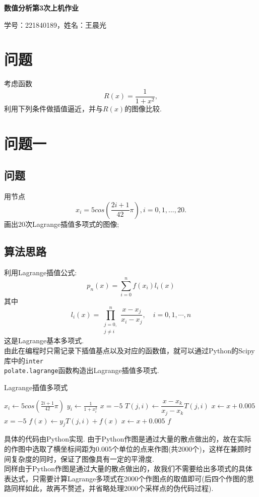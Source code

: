 \documentclass[UTF8,ctexart,a4paper,11pt,openany]{article}
\theoremstyle{definition}
\newcommand\e{\leftarrow}
\begin{document}
\begin{center}
{\huge \textbf{数值分析第3次上机作业}}

{\large 学号：221840189，姓名：王晨光}
\end{center}
\section{问题}
    考虑函数$$R(x)=\frac{1}{1+x^2},$$利用下列条件做插值逼近，并与$R(x)$的图像比较.
\section{问题一}
    \subsection{问题}
    用节点$$x_i=5cos(\frac{2i+1}{42}\pi),i=0,1,...,20.$$画出20次Lagrange插值多项式的图像;
    \subsection{算法思路}
    利用Lagrange插值公式:
\[
    p_n(x)=\sum_{i=0}^n f(x_i)l_i(x)
\]
其中
$$
    l_i(x)=\prod_{\substack {j=0, \\ j\neq i}}^n \dfrac{x-x_j}{x_i-x_j},\quad i=0,1,\cdots,n
$$
这是Lagrange基本多项式.\\ \indent
    由此在编程时只需记录下插值基点以及对应的函数值，就可以通过Python的Scipy库中的\texttt{inter\\polate.lagrange}函数构造出Lagrange插值多项式.
    \begin{algorithm}[H]
        \caption{Lagrange插值多项式}
        \begin{algorithmic}[1]
                \State $x_i\e 5cos(\frac{2i+1}{42}\pi)$
                \State $y_i\e \frac{1}{1+x_i^2}$
            \EndFor
            \State $x=-5$ 
                            \State $T(j,i)\e \dfrac{x-x_k}{x_j-x_k}T(j,i)$
                        \EndIf
                    \EndFor
                \EndFor
                \State $x\e x+0.005$
            \EndFor
            \State $x=-5$
                    \State $f(x)\e y_j T(j,i)+f(x)$
                \EndFor
                \State $x\e x+0.005$
            \EndFor
            \State \Return $f$ 
        \end{algorithmic}
    \end{algorithm}
    具体的代码由Python实现. 由于Python作图是通过大量的散点做出的，故在实际的作图中选取了横坐标间距为0.005个单位的点来作图(共2000个)，这样在兼顾时间复杂度的同时，保证了图像具有一定的平滑度.\\ \indent
    同样由于Python作图是通过大量的散点做出的，故我们不需要给出多项式的具体表达式，只需要计算Lagrange多项式在2000个作图点的取值即可(后四个作图的思路同样如此，故再不赘述，并省略处理2000个采样点的伪代码过程).
\end{document}

